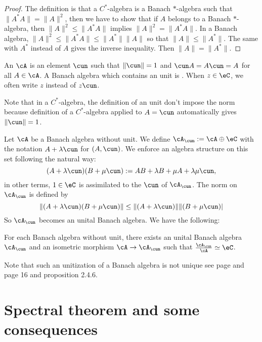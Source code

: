 \begin{proof}
The definition is that a $C^*$-algebra is a Banach $*$-algebra such that $\|A^*A\|=\|A\|^2$, then we have to show that  if $A$ belongs to a Banach $*$-algebra, then $\|A\|^2\leq\|A^*A\|$ implies $\|A\|^2=\|A^*A\|$. In a Banach algebra, $\|A\|^2\leq\|A^*A\|\leq\|A^*\|\|A\|$ so that $\|A\|\leq\|A^*\|$. The same with $A^*$ instead of $A$ gives the inverse inequality. Then $\|A\|=\|A^*\|$.
\end{proof}

\begin{definition}
An  $\cA$ is an element $\cun$ such that $\|\cun\|=1$ and $\cun A=A\cun=A$ for all $A\in\cA$. A Banach algebra which contains an unit is . When $z\in\eC$, we often write $z$ instead of $z\cun$.
\end{definition}

Note that in a $C^*$-algebra, the definition of an unit don't impose the norm because definition of a $C^*$-algebra applied to $A=\cun$ automatically gives $\|\cun\|=1$.

Let $\cA$ be a Banach algebra without unit. We define $\cA_{\cun}:=\cA\oplus\eC$ with the notation $A+\lambda\cun$ for $(A,\cun)$. We enforce an algebra structure on this set following the natural way:
\[
  (A+\lambda\cun)(B+\mu\cun):=AB+\lambda B+\mu A+\lambda\mu\cun,
\]
in other terms, $1\in\eC$ is assimilated to the $\cun$ of $\cA_{\cun}$. The norm on $\cA_{\cun}$ is defined by
\[
   \|(A+\lambda\cun)(B+\mu\cun)\|\leq\|(A+\lambda\cun)\|\|(B+\mu\cun)|
\]
So $\cA_{\cun}$ becomes an unital Banach algebra. We have the following:

\begin{proposition}
For each Banach algebra without unit, there exists an unital Banach algebra $\cA_{\cun}$ and an isometric morphism $\cA\to\cA_{\cun}$ such that $\frac{\cA_{\cun}}{\cA}\simeq\eC$.
\end{proposition}

Note that such an unitization of a Banach algebra is not unique see page \pageref{pg:unit_nonunic} and \cite{Landsman} page 16 and proposition 2.4.6.


\section{Spectral theorem and some consequences}\label{pg_spectralthe}

